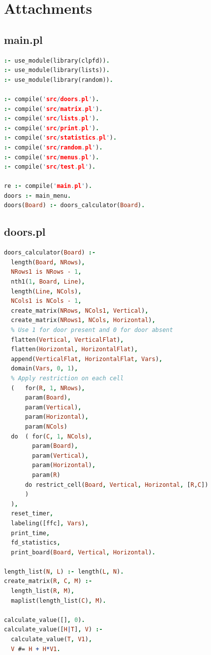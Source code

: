 \documentclass[runningheads]{llncs}
\begin{document}
\newpage

\section{Attachments}
\label{sec:attachments}

\subsection{main.pl}

\begin{center}
\begin{minipage}{0.85\textwidth}
\centering\ttfamily
\begin{lstlisting}[language=Prolog]
:- use_module(library(clpfd)).
:- use_module(library(lists)).
:- use_module(library(random)).

:- compile('src/doors.pl').
:- compile('src/matrix.pl').
:- compile('src/lists.pl').
:- compile('src/print.pl').
:- compile('src/statistics.pl').
:- compile('src/random.pl').
:- compile('src/menus.pl').
:- compile('src/test.pl').

re :- compile('main.pl').
doors :- main_menu.
doors(Board) :- doors_calculator(Board).

\end{lstlisting}
\end{minipage}
\end{center}

\subsection{doors.pl}

\begin{center}
\begin{minipage}{0.85\textwidth}
\centering\ttfamily
\begin{lstlisting}[language=Prolog]
doors_calculator(Board) :-
  length(Board, NRows),
  NRows1 is NRows - 1,
  nth1(1, Board, Line),
  length(Line, NCols),
  NCols1 is NCols - 1,
  create_matrix(NRows, NCols1, Vertical),
  create_matrix(NRows1, NCols, Horizontal),
  % Use 1 for door present and 0 for door absent
  flatten(Vertical, VerticalFlat),
  flatten(Horizontal, HorizontalFlat),
  append(VerticalFlat, HorizontalFlat, Vars),
  domain(Vars, 0, 1),
  % Apply restriction on each cell
  (   for(R, 1, NRows),
      param(Board),
      param(Vertical),
      param(Horizontal),
      param(NCols)
  do  ( for(C, 1, NCols),
        param(Board),
        param(Vertical),
        param(Horizontal),
        param(R)
      do restrict_cell(Board, Vertical, Horizontal, [R,C])
      )
  ),
  reset_timer,
  labeling([ffc], Vars),
  print_time,
  fd_statistics,
  print_board(Board, Vertical, Horizontal).

length_list(N, L) :- length(L, N).
create_matrix(R, C, M) :-
  length_list(R, M),
  maplist(length_list(C), M).

calculate_value([], 0).
calculate_value([H|T], V) :-
  calculate_value(T, V1),
  V #= H + H*V1.
  
\end{lstlisting}
\end{minipage}
\end{center}
\end{document}
